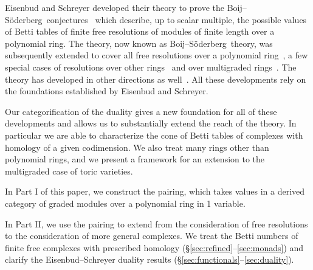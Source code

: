 \documentclass[12pt]{amsart}
\theoremstyle{definition}
\theoremstyle{remark}
\def\BS{Boij--S\"oderberg~}
\begin{document}
 Eisenbud and Schreyer developed their theory to prove the \BS conjectures~\cite{boij-sod1}
which describe, up to scalar multiple, the possible values of Betti tables of finite free resolutions of modules of finite length over a polynomial ring.  
The theory, now known as \BS theory, was subsequently extended to cover all free resolutions over a polynomial ring~\cite{boij-sod2,eis-schrey2},
a few special cases of resolutions over other rings~\cite{bbeg,beks-local} and over multigraded rings~\cite{boij-floystad,floystad-multigraded}. The theory has developed in other directions as well~\cite{beks-tensor,erman-semigroup,ees-filtering,sam-weyman}. All these developments rely on the foundations established by Eisenbud and Schreyer. 

Our categorification of the duality gives a new foundation for all of these developments and allows us to substantially extend the reach of the theory.  In particular we are able to characterize the cone of Betti tables of complexes with homology of a given codimension.
We also treat many rings other than polynomial rings, and we present a framework for an extension to the multigraded case of toric varieties.




In Part I of this paper, 
we construct the pairing, which takes values in a derived category of graded modules over a polynomial ring in 1 variable.

In Part II, we use the pairing to extend from the consideration of free resolutions to the consideration of more general complexes.
We treat the Betti numbers of finite free complexes with prescribed homology  (\S\ref{sec:refined}--\ref{sec:monads}) and clarify the Eisenbud--Schreyer duality results (\S\ref{sec:functionals}--\ref{sec:duality}).  
\end{document}
